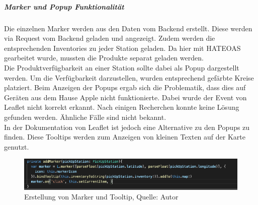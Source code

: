 \subparagraph{Marker und Popup Funktionalität}
Die einzelnen Marker werden aus den Daten vom Backend erstellt. Diese werden via Request vom Backend geladen und angezeigt. Zudem werden die entsprechenden Inventories zu jeder Station geladen. Da hier mit \ac{HATEOAS} gearbeitet wurde, mussten die Produkte separat geladen werden. \\
Die Produktverfügbarkeit an einer Station sollte dabei als Popup dargestellt werden. Um die Verfügbarkeit darzustellen, wurden entsprechend gefärbte Kreise platziert.  
Beim Anzeigen der Popups ergab sich die Problematik, dass dies auf Geräten aus dem Hause Apple nicht funktionierte. Dabei wurde der Event von Leaflet nicht korrekt erkannt. Nach einigen Recherchen konnte keine Lösung gefunden werden. Ähnliche Fälle sind nicht bekannt. \\
In der Dokumentation von Leaflet ist jedoch eine Alternative zu den Popups zu finden. Diese Tooltips werden zum Anzeigen von kleinen Texten auf der Karte genutzt.
\begin{figure}[H]
	\centering
	\includegraphics[width=1\textwidth]{images/tooltipImp.PNG}
	\caption[Erstellung von Marker und Tooltip]{Erstellung von Marker und Tooltip, Quelle: Autor}
	\label{img: tooltip}
\end{figure} 

